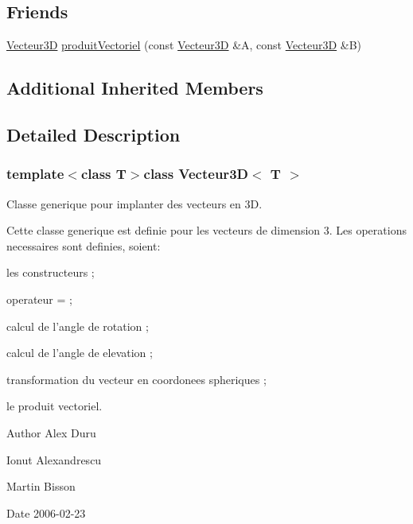 \subsection*{Friends}
\begin{DoxyCompactItemize}
\item 
\hyperlink{class_vecteur3_d}{Vecteur3\-D} \hyperlink{class_vecteur3_d_ad694a02c6636d9364299682ca69a7818}{produit\-Vectoriel} (const \hyperlink{class_vecteur3_d}{Vecteur3\-D} \&A, const \hyperlink{class_vecteur3_d}{Vecteur3\-D} \&B)
\end{DoxyCompactItemize}
\subsection*{Additional Inherited Members}


\subsection{Detailed Description}
\subsubsection*{template$<$class T$>$class Vecteur3\-D$<$ T $>$}

Classe generique pour implanter des vecteurs en 3\-D.

Cette classe generique est definie pour les vecteurs de dimension 3. Les operations necessaires sont definies, soient\-:
\begin{DoxyItemize}
\item les constructeurs ;
\item operateur = ;
\item calcul de l'angle de rotation ;
\item calcul de l'angle de elevation ;
\item transformation du vecteur en coordonees spheriques ;
\item le produit vectoriel.
\end{DoxyItemize}

\begin{DoxyAuthor}{Author}
Alex Duru 

Ionut Alexandrescu 

Martin Bisson 
\end{DoxyAuthor}
\begin{DoxyDate}{Date}
2006-\/02-\/23 
\end{DoxyDate}


